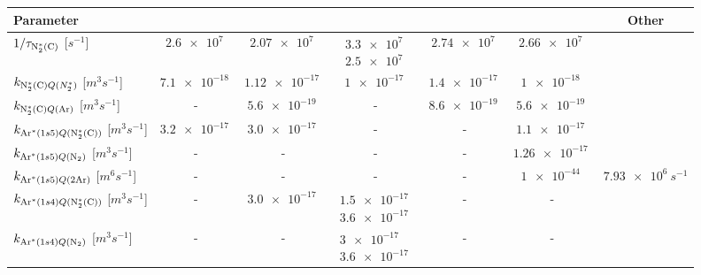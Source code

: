 \hspace*{1em}\begin{table}[h!]
    \scriptsize
    \centering
    \begin{tabular}{lcccccc}
        \toprule
        {\bf Parameter} & \cite{friedl2012spectral} & \cite{puech1977energy} & \cite{buzulutskov2017photon} & \cite{zhang2018femtosecond} & \cite{Sauerbrey1981}  & Other \\
        
        \midrule
        
        $1/\tau_{\mathrm{N}_2^*(\mathrm{C})}$ [$\unit{s^{-1}}$]  & $\SI{2.6e7}{}$ & $\SI{2.07e7}{}$ & $\begin{matrix}
            \SI{3.3e7}{} \\
            \SI{2.5e7}{}
        \end{matrix}$ & $\SI{2.74e7}{}$ & $\SI{2.66e7}{}$ \\[1.5em]
        
        $k_{\mathrm{N}_2^*(\mathrm{C}) Q(N_2^{*})}$ [$\unit{m^3 s^{-1}}$] &  $\SI{7.1e-18}{}$ & $\SI{1.12e-17}{}$ & $\SI{1e-17}{}$ & $\SI{1.4e-17}{}$ & $\SI{1e-18}{}$ \\[0.7em]
        
        $k_{\mathrm{N}_2^*(\mathrm{C}) Q(\mathrm{Ar})}$ [$\unit{m^3 s^{-1}}$] & - & $\SI{5.6e-19}{}$ & - & $\SI{8.6e-19}{}$ & $\SI{5.6e-19}{}$ \\[0.4em]
        
        \midrule
        
        $k_{\mathrm{Ar}^*(1s5) Q(\mathrm{N}_2^*(\mathrm{C}))}$ [$\unit{m^3 s^{-1}}$] & $\SI{3.2e-17}{}$ & $\SI{3.0e-17}{}$ & - & - & $\SI{1.1e-17}{}$ \\[0.7em] 
        $k_{\mathrm{Ar}^*(1s5) Q(\mathrm{N}_2)}$ [$\unit{m^3 s^{-1}}$] & - & - & - & - & $\SI{1.26e-17}{}$ \\[0.7em] 
        $k_{\mathrm{Ar}^*(1s5) Q(2\mathrm{Ar})}$ [$\unit{m^6 s^{-1}}$] & -  & - &  - & - & $\SI{1e-44}{}$ & $\SI{7.93e6}{s^{-1}}$ \\[0.4em]
        
        \midrule
        
        $k_{\mathrm{Ar}^*(1s4) Q(\mathrm{N}_2^*(\mathrm{C}))}$ [$\unit{m^3 s^{-1}}$]  & - & $\SI{3.0e-17}{}$ & $\begin{matrix}
            \SI{1.5e-17}{} \\
            \SI{3.6e-17}{} 
        \end{matrix}$ & - & - \\[1.5em] 
        
        $k_{\mathrm{Ar}^*(1s4) Q(\mathrm{N}_2)}$ [$\unit{m^3 s^{-1}}$]  & - & - & $\begin{matrix}
            \SI{3e-17}{} \\
            \SI{3.6e-17}{} 
        \end{matrix}$ & - & - \\[1.5em] 
        

\end{tabular}
\end{table}
